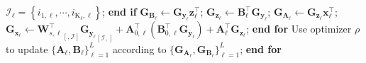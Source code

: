 \begin{algorithm}[t]
\begin{algorithmic}[1]
            \State \quad\qquad $\mathcal{I}_\ell = \left\{i_{1,\ell},\cdots,i_{\text{K}_\ell,\ell}\right\}$; 
        \State \quad\quad\textbf{end if}
        \State \quad\quad $\mathbf{G}_{\mathbf{B}_\ell}\gets\mathbf{G}_{\mathbf{y}_\ell}\mathbf{z}_\ell^\top$;
        \State \quad\quad $\mathbf{G}_{\mathbf{z}_\ell}\gets\mathbf{B}_{\ell}^\top\mathbf{G}_{\mathbf{y}_{\ell}}$;
        \State \quad\quad
        $\mathbf{G}_{\mathbf{A}_\ell}\gets\mathbf{G}_{\mathbf{z}_\ell}\mathbf{x}_\ell^\top$;
        \State \quad\quad $\mathbf{G}_{\mathbf{x}_\ell} \gets {\mathbf{W}_{s,\ell}^\top}_{[,\mathcal{I}]} {\mathbf{G}_{\mathbf{y}_\ell}}_{[\mathcal{I},]} + \mathbf{A}_{0,\ell}^\top(\mathbf{B}_{0,\ell}^\top \mathbf{G}_{\mathbf{y}_\ell})+\mathbf{A}_\ell^\top\mathbf{G}_{\mathbf{z}_\ell}$;
\State\quad\textbf{end for}
\State Use optimizer $\rho$ to update $\{\mathbf{A}_\ell,\mathbf{B}_\ell\}_{\ell=1}^L$ according to $\{\mathbf{G}_{\mathbf{A}_\ell},\mathbf{G}_{\mathbf{B}_\ell}\}_{\ell=1}^L$;
\State\textbf{end for}
\end{algorithmic}
\end{algorithm}










